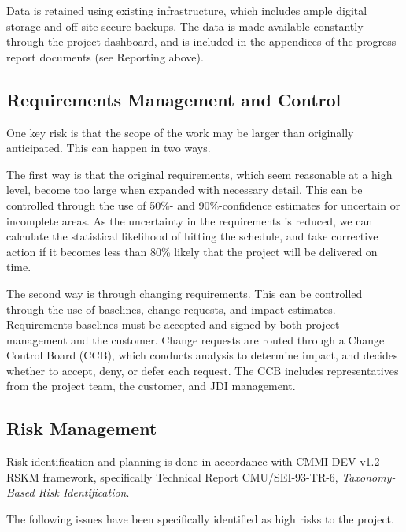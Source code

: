 \documentclass[11pt]{article}
\begin{document}
Data is retained using existing infrastructure, which includes ample digital storage and off-site
secure backups.  The data is made available constantly through the project dashboard, and is
included in the appendices of the progress report documents (see Reporting above).

\subsection{Requirements Management and Control}
One key risk is that the scope of the work may be larger than originally anticipated.  This can
happen in two ways.

The first way is that the original requirements, which seem reasonable at a high level, become too
large when expanded with necessary detail.  This can be controlled through the use of 50\%- and
90\%-confidence estimates for uncertain or incomplete areas.  As the uncertainty in the requirements
is reduced, we can calculate the statistical likelihood of hitting the schedule, and take corrective
action if it becomes less than 80\% likely that the project will be delivered on time.

The second way is through changing requirements.  This can be controlled through the use of
baselines, change requests, and impact estimates.  Requirements baselines must be accepted and
signed by both project management and the customer.  Change requests are routed through a Change
Control Board (CCB), which conducts analysis to determine impact, and decides whether to accept,
deny, or defer each request.  The CCB includes representatives from the project team, the customer,
and JDI management.


\subsection{Risk Management}
Risk identification and planning is done in accordance with CMMI-DEV v1.2 RSKM framework,
specifically Technical Report CMU/SEI-93-TR-6, \textit{Taxonomy-Based Risk Identification}.

The following issues have been specifically identified as high risks to the project.
\end{document}
